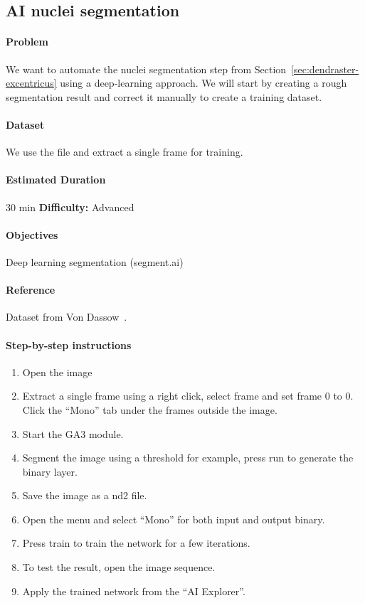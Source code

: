 \subsection{AI nuclei segmentation} \label{sec:ai-nuclei-segmentation}


\paragraph{Problem} We want to automate the nuclei segmentation step from Section~\ref{sec:dendraster-excentricus} using a deep-learning approach. We will start by creating a rough segmentation result and correct it manually to create a training dataset.

\paragraph{Dataset} We use the file  and extract a single frame for training.

\paragraph{Estimated Duration} 30 min \quad \textbf{Difficulty:} Advanced

\paragraph{Objectives} Deep learning segmentation (segment.ai)

\paragraph{Reference} Dataset from Von Dassow~\cite{vondassow2011}.

\paragraph{Step-by-step instructions}
\begin{enumerate}
    \item Open the image  
    \item Extract a single frame using a right click, select frame and set frame 0 to 0. Click the ``Mono'' tab under the frames outside the image.
    \item Start the GA3 module.
    \item Segment the image using a threshold for example, press run to generate the binary layer.
    \item Save the image as a nd2 file.
    \item Open the menu  and select ``Mono'' for both input and output binary.
    \item Press train to train the network for a few iterations.
    \item To test the result, open the image sequence.
    \item Apply the trained network from the ``AI Explorer''.
\end{enumerate}
